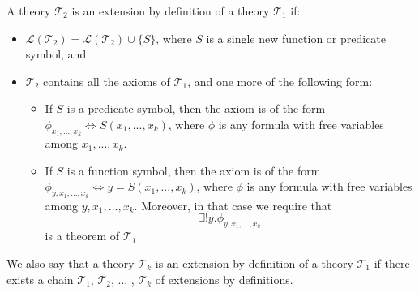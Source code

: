 \begin{defin}
A theory $\mathcal{T}_2$ is an extension by definition of a theory $\mathcal{T}_1$ if:
\begin{itemize}
\item $\mathcal{L}(\mathcal{T}_2) = \mathcal{L}(\mathcal{T}_2) \cup \lbrace S \rbrace$, where $S$ is a single new function or predicate symbol, and
\item $\mathcal{T}_2$ contains all the axioms of $\mathcal{T}_1$, and one more of the following form:
\begin{itemize}
\item If $S$ is a predicate symbol, then the axiom is of the form $\phi_{x_1,...,x_k} \iff S(x_1,...,x_k)$, where $\phi$ is any formula with free variables among $x_1,...,x_k$.
\item If $S$ is a function symbol, then the axiom is of the form $\phi_{y, x_1,...,x_k} \iff y = S(x_1,...,x_k)$, where $\phi$ is any formula with free variables among $y, x_1,...,x_k$.
Moreover, in that case we require that 
$$
\exists ! y. \phi_{y, x_1,...,x_k}
$$
is a theorem of $\mathcal{T}_1$
\end{itemize}
\end{itemize}
\end{defin}
We also say that a theory $\mathcal{T}_k$ is an extension by definition of a theory $\mathcal{T}_1$ if there exists a chain $\mathcal{T}_1$, $\mathcal{T}_2$, ... , $\mathcal{T}_k$ of extensions by definitions.


